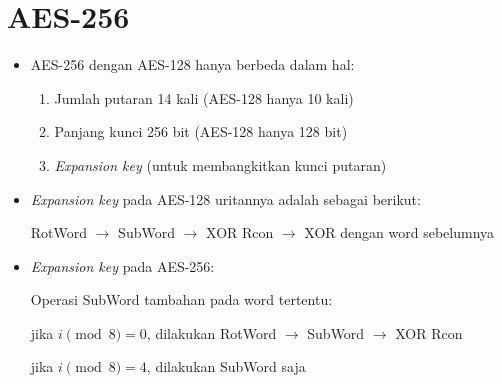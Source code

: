 \documentclass{article}
\begin{document}

\section*{AES-256}

\begin{itemize}
    \item AES-256 dengan AES-128 hanya berbeda dalam hal:
    \begin{enumerate}
        \item Jumlah putaran 14 kali (AES-128 hanya 10 kali)
        \item Panjang kunci 256 bit (AES-128 hanya 128 bit)
        \item \textit{Expansion key} (untuk membangkitkan kunci putaran)
    \end{enumerate}

    \item \textit{Expansion key} pada AES-128 uritannya adalah sebagai berikut:
    
    RotWord $\rightarrow$ SubWord $\rightarrow$ XOR Rcon $\rightarrow$ XOR dengan word sebelumnya

    \item \textit{Expansion key} pada AES-256:
    
    Operasi SubWord tambahan pada word tertentu:
    
    jika $i \pmod 8 = 0$, dilakukan RotWord $\rightarrow$ SubWord $\rightarrow$ XOR Rcon
    
    jika $i \pmod 8 = 4$, dilakukan SubWord saja
\end{itemize}
\end{document}

